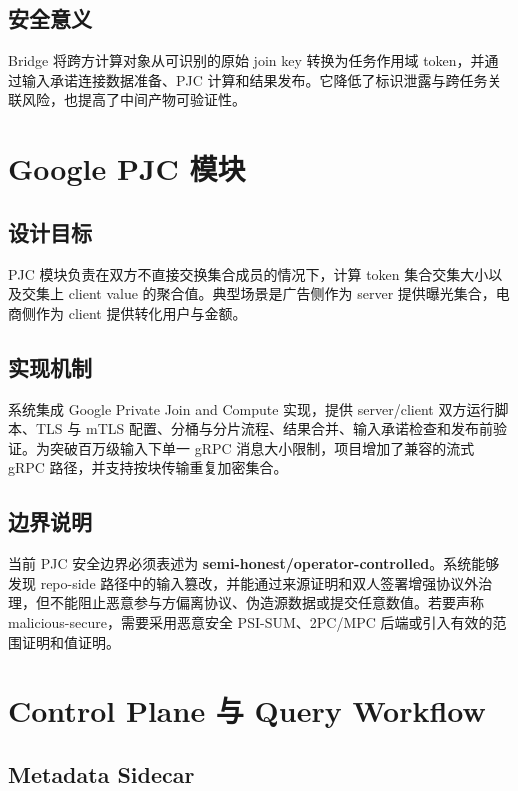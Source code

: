 \documentclass[UTF8,a4paper,12pt,oneside]{ctexrep}
\begin{document}
\subsection{安全意义}

Bridge 将跨方计算对象从可识别的原始 join key 转换为任务作用域 token，并通过输入承诺连接数据准备、PJC 计算和结果发布。它降低了标识泄露与跨任务关联风险，也提高了中间产物可验证性。

\section{Google PJC 模块}

\subsection{设计目标}

PJC 模块负责在双方不直接交换集合成员的情况下，计算 token 集合交集大小以及交集上 client value 的聚合值。典型场景是广告侧作为 server 提供曝光集合，电商侧作为 client 提供转化用户与金额。

\subsection{实现机制}

系统集成 Google Private Join and Compute 实现，提供 server/client 双方运行脚本、TLS 与 mTLS 配置、分桶与分片流程、结果合并、输入承诺检查和发布前验证。为突破百万级输入下单一 gRPC 消息大小限制，项目增加了兼容的流式 gRPC 路径，并支持按块传输重复加密集合。

\subsection{边界说明}

当前 PJC 安全边界必须表述为 \textbf{semi-honest/operator-controlled}。系统能够发现 repo-side 路径中的输入篡改，并能通过来源证明和双人签署增强协议外治理，但不能阻止恶意参与方偏离协议、伪造源数据或提交任意数值。若要声称 malicious-secure，需要采用恶意安全 PSI-SUM、2PC/MPC 后端或引入有效的范围证明和值证明。

\section{Control Plane 与 Query Workflow}

\subsection{Metadata Sidecar}
\end{document}
